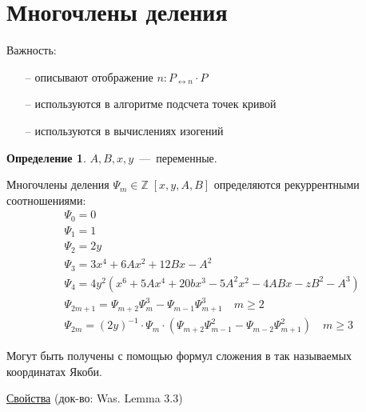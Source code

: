 \documentclass[12pt]{article}
\newcommand{\Z}{{{\mathbb Z}}}
\theoremstyle{definition}
\newtheorem{definition}[theorem]{Определение}
\theoremstyle{definition}
\theoremstyle{definition}
\begin{document}
\section{Многочлены деления}

Важность:
\begin{itemize}
	\item [--] описывают отображение $ n: {P_{ \leftrightarrow n}} \cdot P$
	\item [--] используются в алгоритме подсчета точек кривой
	\item [--] используются в вычислениях изогений
\end{itemize}

\begin{definition}
	\label{def_04}
	$A,B,x,y$~---~переменные.
	
	Многочлены деления ${\Psi _m} \in \Z\;\left[ {x,y,A,B} \right]$ определяются рекуррентными соотношениями:
	$$
	\begin{aligned}
	&{\Psi _0} = 0 \\
	&{\Psi _1} = 1 \\
	&{\Psi _2} = 2y \\
	&{\Psi _3} = 3{x^4} + 6A{x^2} + 12Bx - {A^2} \\
	&{\Psi _4} = 4{y^2}\left( {{x^6} + 5A{x^4} + 20b{x^3} - 5{A^2}{x^2} - 4ABx - z{B^2} - {A^3}} \right) \\
	&{\Psi _{2m + 1}} = {\Psi _{m + 2}}\Psi _m^3 - {\Psi _{m - 1}}\Psi _{m + 1}^3 \quad m \geqslant 2 \\
	&{\Psi _{2m}} = {\left( {2y} \right)^{ - 1}} \cdot {\Psi _m} \cdot \left( {{\Psi _{m + 2}}\Psi _{m - 1}^2 - {\Psi _{m - 2}}\Psi _{m + 1}^2} \right)\quad m \geqslant 3
	\end{aligned}
	$$
\end{definition}

Могут быть получены с помощью формул сложения в так называемых координатах Якоби.

\underline{Свойства} (док-во: Was. Lemma 3.3)
\end{document}
